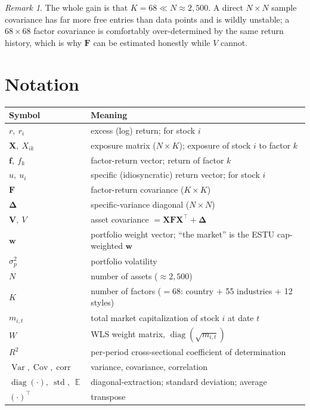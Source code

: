 \documentclass[11pt]{article}
\theoremstyle{definition}
\theoremstyle{plain}
\theoremstyle{remark}
\newtheorem*{remark}{Remark}
\DeclareMathOperator{\Var}{Var}
\DeclareMathOperator{\Cov}{Cov}
\DeclareMathOperator{\Corr}{corr}
\DeclareMathOperator{\diag}{diag}
\DeclareMathOperator{\std}{std}
\DeclareMathOperator*{\avg}{\mathbb{E}}
\newcommand{\T}{^{\!\top}}
\newcommand{\wvec}{\mathbf{w}}
\newcommand{\Xmat}{\mathbf{X}}
\newcommand{\Fmat}{\mathbf{F}}
\newcommand{\Vmat}{\mathbf{V}}
\newcommand{\Del}{\boldsymbol{\Delta}}
\newcommand{\fvec}{\mathbf{f}}
\begin{document}
\begin{remark}
The whole gain is that $K=68 \ll N\approx 2{,}500$. A direct $N\times N$ sample covariance has far more free entries than data points and is wildly unstable; a $68\times 68$ factor covariance is comfortably over-determined by the same return history, which is why $\Fmat$ can be estimated honestly while $V$ cannot.
\end{remark}

\section*{Notation}

\begin{center}
\small
\begin{tabular}{@{}ll@{}}
\toprule
Symbol & Meaning \\
\midrule
$r,\ r_i$ & excess (log) return; for stock $i$ \\
$\Xmat,\ X_{ik}$ & exposure matrix ($N\times K$); exposure of stock $i$ to factor $k$ \\
$\fvec,\ f_k$ & factor-return vector; return of factor $k$ \\
$u,\ u_i$ & specific (idiosyncratic) return vector; for stock $i$ \\
$\Fmat$ & factor-return covariance ($K\times K$) \\
$\Del$ & specific-variance diagonal ($N\times N$) \\
$\Vmat,\ V$ & asset covariance $=\Xmat\Fmat\Xmat\T+\Del$ \\
$\wvec$ & portfolio weight vector; ``the market'' is the ESTU cap-weighted $\wvec$ \\
$\sigma^2_p$ & portfolio volatility \\
$N$ & number of assets ($\approx 2{,}500$) \\
$K$ & number of factors ($=68$: country $+$ 55 industries $+$ 12 styles) \\
$m_{i,t}$ & total market capitalization of stock $i$ at date $t$ \\
$W$ & WLS weight matrix, $\diag(\sqrt{m_{i,t}})$ \\
$R^2$ & per-period cross-sectional coefficient of determination \\
$\Var,\Cov,\Corr$ & variance, covariance, correlation \\
$\diag(\cdot),\ \std,\ \avg$ & diagonal-extraction; standard deviation; average \\
$(\cdot)\T$ & transpose \\
\bottomrule
\end{tabular}
\end{center}
\end{document}
